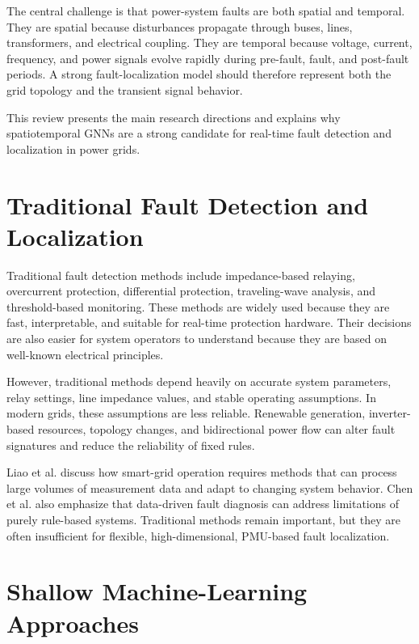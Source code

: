 \documentclass[12pt,a4paper]{article}
\begin{document}
The central challenge is that power-system faults are both spatial and temporal. They are spatial because disturbances propagate through buses, lines, transformers, and electrical coupling. They are temporal because voltage, current, frequency, and power signals evolve rapidly during pre-fault, fault, and post-fault periods. A strong fault-localization model should therefore represent both the grid topology and the transient signal behavior.

This review presents the main research directions and explains why spatiotemporal GNNs are a strong candidate for real-time fault detection and localization in power grids.

\section{Traditional Fault Detection and Localization}

Traditional fault detection methods include impedance-based relaying, overcurrent protection, differential protection, traveling-wave analysis, and threshold-based monitoring. These methods are widely used because they are fast, interpretable, and suitable for real-time protection hardware. Their decisions are also easier for system operators to understand because they are based on well-known electrical principles.

However, traditional methods depend heavily on accurate system parameters, relay settings, line impedance values, and stable operating assumptions. In modern grids, these assumptions are less reliable. Renewable generation, inverter-based resources, topology changes, and bidirectional power flow can alter fault signatures and reduce the reliability of fixed rules.

Liao et al. \cite{liao2021} discuss how smart-grid operation requires methods that can process large volumes of measurement data and adapt to changing system behavior. Chen et al. \cite{chen2020} also emphasize that data-driven fault diagnosis can address limitations of purely rule-based systems. Traditional methods remain important, but they are often insufficient for flexible, high-dimensional, PMU-based fault localization.

\section{Shallow Machine-Learning Approaches}
\end{document}

